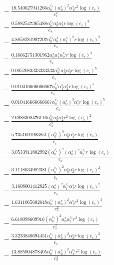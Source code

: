\documentclass[10pt]{article}
\begin{document}
\begin{align*}
&{}  - \frac{18.540627941266 \alpha_{0}^{c_s} \left(\alpha_{0}^s\right)^{2} \alpha_{1}^s r^{2} \log{\left(c_{s} \right)}}{c_{s}^{2}} \\
&{}  - \frac{0.5882547365488 \alpha_{0}^{c_s} \alpha_{0}^s \alpha_{3}^s r \log{\left(c_{s} \right)}^{3}}{c_{s}} \\
&{}  - \frac{4.8858281907207 \alpha_{0}^{c_s} \alpha_{0}^s \left(\alpha_{1}^s\right)^{2} r \log{\left(c_{s} \right)}^{2}}{c_{s}} \\
&{}  - \frac{0.16662751301962 \alpha_{0}^s \alpha_{1}^s \alpha_{2}^{c_s} r \log{\left(c_{s} \right)}^{3}}{c_{s}} \\
&{}  - \frac{0.0052083333333333 \alpha_{0}^{c_s} \alpha_{0}^s \alpha_{3}^s r \log{\left(c_{s} \right)}^{5}}{c_{s}} \\
&{}  - \frac{0.010416666666667 \alpha_{0}^{c_s} \alpha_{1}^s \alpha_{2}^s r \log{\left(c_{s} \right)}^{5}}{c_{s}} \\
&{}  - \frac{0.010416666666667 \alpha_{0}^{c_s} \left(\alpha_{0}^s\right)^{3} \alpha_{1}^s r \log{\left(c_{s} \right)}^{5}}{c_{s}} \\
&{}  - \frac{2.6988308476116 \alpha_{0}^{c_s} \alpha_{0}^s \alpha_{2}^s r^{2} \log{\left(c_{s} \right)}^{2}}{c_{s}^{2}} \\
&{}  - \frac{5.7351691983851 \left(\alpha_{0}^{c_s}\right)^{3} \alpha_{0}^s \alpha_{1}^s r \log{\left(c_{s} \right)}}{c_{s}} \\
&{}  - \frac{3.0533911802992 \left(\alpha_{0}^{c_s}\right)^{2} \left(\alpha_{0}^s\right)^{2} \alpha_{1}^{c_s} r \log{\left(c_{s} \right)}}{c_{s}} \\
&{}  - \frac{3.1118634982381 \left(\alpha_{0}^{c_s}\right)^{2} \alpha_{0}^s \alpha_{2}^s r \log{\left(c_{s} \right)}^{2}}{c_{s}} \\
&{}  - \frac{3.1608001412825 \left(\alpha_{0}^s\right)^{2} \alpha_{1}^{c_s} \alpha_{1}^s r \log{\left(c_{s} \right)}^{2}}{c_{s}} \\
&{}  - \frac{1.6311065602648 \alpha_{0}^{c_s} \left(\alpha_{0}^s\right)^{2} \alpha_{1}^s r^{2} \log{\left(c_{s} \right)}^{3}}{c_{s}^{2}} \\
&{}  - \frac{6.618098609916 \left(\alpha_{0}^{c_s}\right)^{2} \alpha_{0}^s \alpha_{1}^{c_s} r^{2} \log{\left(c_{s} \right)}}{c_{s}^{2}} \\
&{}  - \frac{3.3233840694451 \alpha_{0}^{c_s} \left(\alpha_{0}^s\right)^{2} \alpha_{2}^s r \log{\left(c_{s} \right)}^{2}}{c_{s}} \\
&{}  - \frac{13.885904878405 \alpha_{0}^{c_s} \left(\alpha_{0}^s\right)^{2} \alpha_{1}^{c_s} r^{2} \log{\left(c_{s} \right)}}{c_{s}^{2}} \\

\end{align*}
\end{document}
